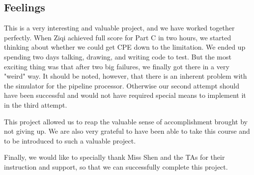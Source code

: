\documentclass{article}
\begin{document}
\subsection{Feelings}
This is a very interesting and valuable project, and we have worked together perfectly. 
When Ziqi achieved full score for Part C in two hours, we started thinking about whether we could get CPE down to the limitation.
We ended up spending two days talking, drawing, and writing code to test.
But the most exciting thing was that after two big failures, we finally got there in a very "weird" way.
It should be noted, however, that there is an inherent problem with the simulator for the pipeline processor. 
Otherwise our second attempt should have been successful and would not have required special means to implement it in the third attempt.

This project allowed us to reap the valuable sense of accomplishment brought by not giving up. We are also very grateful to have been able to take this course and to be introduced to such a valuable project.

Finally, we would like to specially thank Miss Shen and the TAs for their instruction and support, so that we can successfully complete this project.
\end{document}
